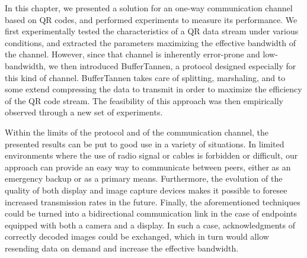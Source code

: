 In this chapter, we presented a solution for an one-way communication channel based on QR codes, and performed experiments to measure its performance. We first experimentally tested the characteristics of a QR data stream under various conditions, and extracted the parameters maximizing the effective bandwidth of the channel. However, since that channel is inherently error-prone and low-bandwidth, we then introduced BufferTannen, a protocol designed especially for this kind of channel. BufferTannen takes care of splitting, marshaling, and to some extend compressing the data to transmit in order to maximize the efficiency of the QR code stream. The feasibility of this approach was then empirically observed through a new set of experiments.

Within the limits of the protocol and of the communication channel, the presented results can be put to good use in a variety of situations. In limited environments where the use of radio signal or cables is forbidden or difficult, our approach can provide an easy way to communicate between peers, either as an emergency backup or as a primary means. Furthermore, the evolution of the quality of both display and image capture devices makes it possible to foresee increased transmission rates in the future. %
Finally, the aforementioned techniques could be turned into a bidirectional communication link in the case of endpoints equipped with both a camera and a display. In such a case, acknowledgments of correctly decoded images could be exchanged, which in turn would allow resending data on demand and increase the effective bandwidth.

